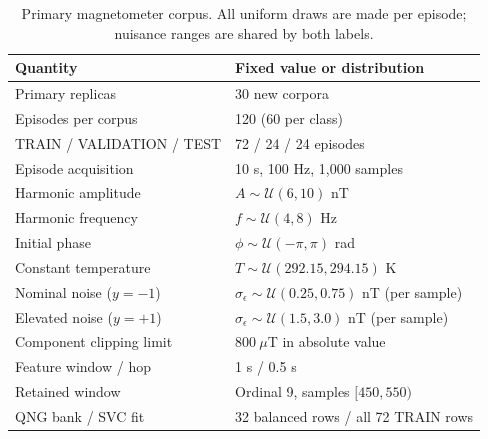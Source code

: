 \begin{table}[t]
\caption{Primary magnetometer corpus. All uniform draws are made per episode; nuisance ranges are shared by both labels.}
\label{tab:benchmark-domain}
\centering
\footnotesize
\setlength{\tabcolsep}{3pt}
\begin{tabular}{@{}p{}p{}@{}}
\toprule
Quantity & Fixed value or distribution \\
\midrule
Primary replicas & 30 new corpora \\
Episodes per corpus & 120 (60 per class) \\
TRAIN / VALIDATION / TEST & 72 / 24 / 24 episodes \\
Episode acquisition & 10 s, 100 Hz, 1,000 samples \\
Harmonic amplitude & $A\sim\mathcal U(6,10)$ nT \\
Harmonic frequency & $f\sim\mathcal U(4,8)$ Hz \\
Initial phase & $\phi\sim\mathcal U(-\pi,\pi)$ rad \\
Constant temperature & $T\sim\mathcal U(292.15,294.15)$ K \\
Nominal noise ($y=-1$) & $\sigma_\epsilon\sim\mathcal U(0.25,0.75)$ nT (per sample) \\
Elevated noise ($y=+1$) & $\sigma_\epsilon\sim\mathcal U(1.5,3.0)$ nT (per sample) \\
Component clipping limit & $800~\mu$T in absolute value \\
Feature window / hop & 1 s / 0.5 s \\
Retained window & Ordinal 9, samples $[450,550)$ \\
QNG bank / SVC fit & 32 balanced rows / all 72 TRAIN rows \\
\bottomrule
\end{tabular}
\end{table}
